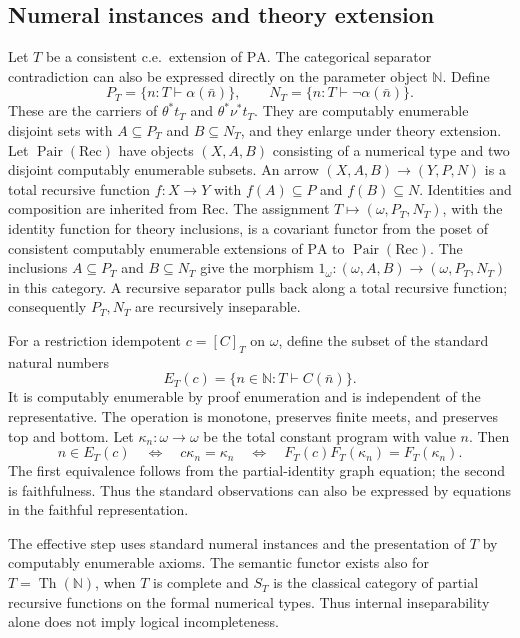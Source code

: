\documentclass[11pt]{article}
\newcommand{\N}{\mathbb N}
\newcommand{\PA}{\mathrm{PA}}
\begin{document}
\subsection{Numeral instances and theory extension}

Let $T$ be a consistent c.e.\ extension of $\PA$.
The categorical separator contradiction can also be expressed directly
on the parameter object $\N$. Define
\[
 P_T=\{n:T\vdash\alpha(\bar n)\},\qquad
 N_T=\{n:T\vdash\neg\alpha(\bar n)\}.
\]
These are the carriers of $\theta^*t_T$ and $\theta^*\nu^*t_T$.
They are computably enumerable disjoint sets with $A\subseteq P_T$
and $B\subseteq N_T$, and they enlarge under theory extension.
Let $\operatorname{Pair}(\mathrm{Rec})$ have objects $(X,A,B)$ consisting
of a numerical type and two disjoint computably enumerable subsets.
An arrow $(X,A,B)\to(Y,P,N)$ is a total recursive function $f:X\to Y$
with $f(A)\subseteq P$ and $f(B)\subseteq N$. Identities and composition
are inherited from $\mathrm{Rec}$. The assignment
$T\mapsto(\omega,P_T,N_T)$, with the identity function for theory
inclusions, is a covariant functor from the poset of consistent
computably enumerable extensions of $\PA$ to
$\operatorname{Pair}(\mathrm{Rec})$.
The inclusions $A\subseteq P_T$ and $B\subseteq N_T$ give the morphism
$1_\omega:(\omega,A,B)\to(\omega,P_T,N_T)$ in this category.
A recursive separator pulls back along a total recursive function;
consequently $P_T,N_T$ are recursively inseparable.


For a restriction idempotent
$c=[C]_T$ on $\omega$, define the subset of the standard natural numbers
\begin{equation}\label{eq:observation}
 E_T(c)=\{n\in\N:T\vdash C(\bar n)\}.
\end{equation}
It is computably enumerable by proof enumeration and is independent of
the representative. The operation is monotone, preserves finite meets,
and preserves top and bottom. Let $\kappa_n:\omega\to\omega$ be the
total constant program with value $n$. Then
\begin{equation}\label{eq:faithful-observation}
 n\in E_T(c)
 \quad\Longleftrightarrow\quad c\kappa_n=\kappa_n
 \quad\Longleftrightarrow\quad
 F_T(c)F_T(\kappa_n)=F_T(\kappa_n).
\end{equation}
The first equivalence follows from the partial-identity graph equation;
the second is faithfulness. Thus the standard observations can also be
expressed by equations in the faithful representation.


The effective step uses standard numeral instances and the presentation
of $T$ by computably enumerable axioms. The semantic functor exists also
for $T=\operatorname{Th}(\N)$, when $T$ is complete and $S_T$ is the
classical category of partial recursive functions on the formal numerical
types. Thus internal inseparability alone does not imply logical
incompleteness.
\end{document}
